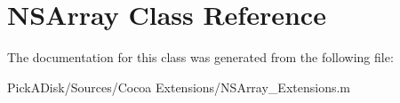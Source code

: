 \hypertarget{class_n_s_array}{
\section{NSArray Class Reference}
\label{class_n_s_array}
}


The documentation for this class was generated from the following file:\begin{DoxyCompactItemize}
\item 
PickADisk/Sources/Cocoa Extensions/NSArray\_\-Extensions.m\end{DoxyCompactItemize}
